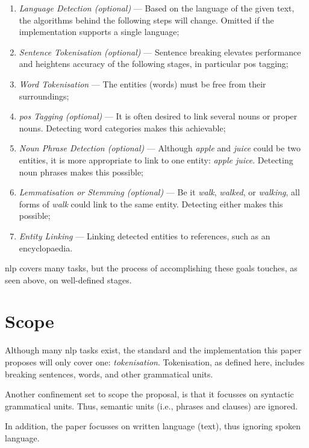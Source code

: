 \begin{enumerate}
\item\emph{Language Detection (optional)} --- Based on the language of the
    given text, the algorithms behind the following steps will change.
  Omitted if the implementation supports a single language;
\item\emph{Sentence Tokenisation (optional)} --- Sentence breaking elevates
    performance and heightens accuracy of the following stages, in
    particular \acrshort{pos} tagging;
\item\emph{Word Tokenisation} --- The entities (words) must be free from
  their surroundings;
\item\emph{\acrfull{pos} Tagging (optional)} --- It is often desired to link
    several nouns or proper nouns.
  Detecting word categories makes this achievable;
\item\emph{Noun Phrase Detection (optional)} --- Although \emph{apple} and
    \emph{juice} could be two entities, it is more appropriate to link to
    one entity: \emph{apple juice}.
  Detecting noun phrases makes this possible;
\item\emph{Lemmatisation or Stemming (optional)} --- Be it \emph{walk},
    \emph{walked}, or \emph{walking}, all forms of \emph{walk} could link
    to the same entity.
  Detecting either makes this possible;
\item\emph{Entity Linking} --- Linking detected entities to references, such
    as an encyclopaedia.
\end{enumerate}

\noindent \gls{nlp} covers many tasks, but the process of accomplishing these
  goals touches, as seen above, on well-defined stages.

\section{Scope}\label{scope}

Although many \gls{nlp} tasks exist, the standard and the implementation
  this paper proposes will only cover one: \emph{tokenisation}.
Tokenisation, as defined here, includes breaking sentences, words, and
other grammatical units.

Another confinement set to scope the proposal, is that it focusses on
  syntactic grammatical units. Thus, semantic units (i.e., phrases and
  clauses) are ignored.

In addition, the paper focusses on written language (text), thus ignoring
  spoken language.

